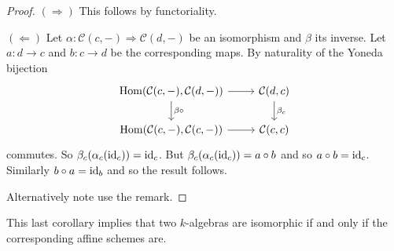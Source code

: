 \documentclass{memoir}
\begin{document}
\begin{proof}
    $(\Rightarrow)$ This follows by functoriality.

    $(\Leftarrow)$ Let $\alpha: \mathcal C(c,-) \Rightarrow \mathcal C(d,-)$ be an isomorphism and $\beta$ its inverse.
    Let $a:d\to c$ and $b:c\to d$ be the corresponding maps.
    By naturality of the Yoneda bijection
    \begin{equation}
        \begin{tikzcd}
            \Hom(\mathcal C(c,-),\mathcal C(d,-)) \arrow[r] \arrow[d,"\beta\circ"] & \mathcal C(d,c) \arrow[d,"\beta_c"] \\
            \Hom(\mathcal C(c,-),\mathcal C(c,-)) \arrow[r] & \mathcal C(c,c) 
        \end{tikzcd}
    \end{equation}
    commutes.
    So $\beta_c(\alpha_c(\operatorname{id}_c)) = \operatorname{id}_c$.
    But $\beta_c(\alpha_c(\operatorname{id}_c)) = a\circ b$ and so $a\circ b = \operatorname{id}_c$.
    Similarly $b\circ a = \operatorname{id}_b$ and so the result follows.

    Alternatively note use the remark. 
\end{proof}
This last corollary implies that two $k$-algebras are isomorphic if and only if the corresponding affine schemes are.
\end{document}
